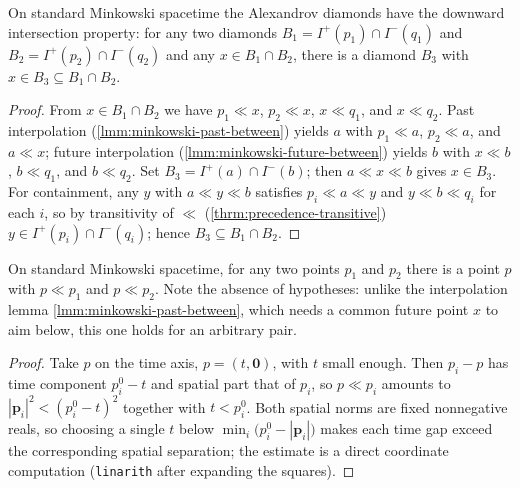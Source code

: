 \begin{lemma}
    \label{lmm:minkowski-diamonds-downward-directed}
    \leanok
    On standard Minkowski spacetime the Alexandrov diamonds have the downward intersection property: for any two diamonds $B_1 = I^+(p_1) \cap I^-(q_1)$ and $B_2 = I^+(p_2) \cap I^-(q_2)$ and any $x \in B_1 \cap B_2$, there is a diamond $B_3$ with $x \in B_3 \subseteq B_1 \cap B_2$.
\end{lemma}
\begin{proof}
    \leanok
    From $x \in B_1 \cap B_2$ we have $p_1 \ll x$, $p_2 \ll x$, $x \ll q_1$, and $x \ll q_2$. Past interpolation (\ref{lmm:minkowski-past-between}) yields $a$ with $p_1 \ll a$, $p_2 \ll a$, and $a \ll x$; future interpolation (\ref{lmm:minkowski-future-between}) yields $b$ with $x \ll b$, $b \ll q_1$, and $b \ll q_2$. Set $B_3 = I^+(a) \cap I^-(b)$; then $a \ll x \ll b$ gives $x \in B_3$. For containment, any $y$ with $a \ll y \ll b$ satisfies $p_i \ll a \ll y$ and $y \ll b \ll q_i$ for each $i$, so by transitivity of $\ll$ (\ref{thrm:precedence-transitive}) $y \in I^+(p_i) \cap I^-(q_i)$; hence $B_3 \subseteq B_1 \cap B_2$.
\end{proof}

\begin{lemma}
    \label{lmm:minkowski-exists-common-past}
    \leanok
    On standard Minkowski spacetime, for any two points $p_1$ and $p_2$ there is a point $p$ with $p \ll p_1$ and $p \ll p_2$. Note the absence of hypotheses: unlike the interpolation lemma \ref{lmm:minkowski-past-between}, which needs a common future point $x$ to aim below, this one holds for an arbitrary pair.
\end{lemma}
\begin{proof}
    \leanok
    Take $p$ on the time axis, $p = (t, \mathbf{0})$, with $t$ small enough. Then $p_i - p$ has time component $p_i^0 - t$ and spatial part that of $p_i$, so $p \ll p_i$ amounts to $|\mathbf{p}_i|^2 < (p_i^0 - t)^2$ together with $t < p_i^0$. Both spatial norms are fixed nonnegative reals, so choosing a single $t$ below $\min_i\bigl(p_i^0 - |\mathbf{p}_i|\bigr)$ makes each time gap exceed the corresponding spatial separation; the estimate is a direct coordinate computation (\texttt{linarith} after expanding the squares).
\end{proof}

